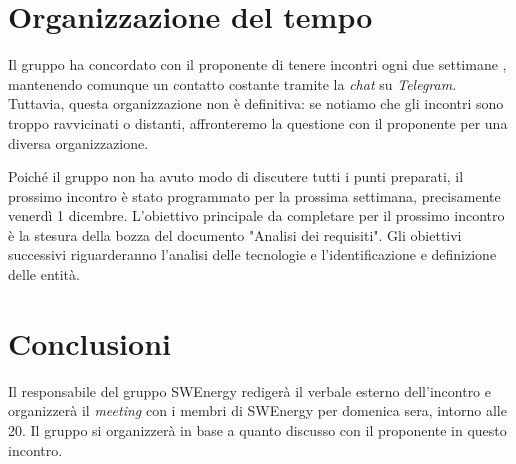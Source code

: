 \section{Organizzazione del tempo}

Il gruppo ha concordato con il proponente di tenere incontri ogni due settimane
, mantenendo comunque un contatto costante tramite la \textit{chat} su \textit{Telegram}.
Tuttavia, questa organizzazione non è definitiva: se notiamo che gli incontri
sono troppo ravvicinati o distanti, affronteremo la questione con il
proponente per una diversa organizzazione.

Poiché il gruppo non ha avuto modo di discutere tutti i punti preparati, il
prossimo incontro è stato programmato per la prossima settimana, precisamente
venerdì 1 dicembre. L'obiettivo principale da completare per il prossimo
incontro è la stesura della bozza del documento "Analisi dei requisiti". Gli
obiettivi successivi riguarderanno l'analisi delle tecnologie e
l'identificazione e definizione delle entità.

\section{Conclusioni}

Il responsabile del gruppo SWEnergy redigerà il verbale esterno dell'incontro
e organizzerà il \textit{meeting} con i membri di SWEnergy per domenica sera,
intorno alle 20. Il gruppo si organizzerà in base a quanto discusso con il
proponente in questo incontro.
